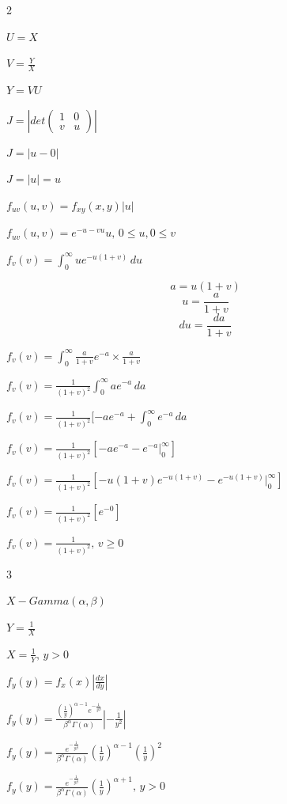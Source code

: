 \documentclass[12 pt]{article}
\begin{document}
    \begin{exercise}{2}
    \hfill

    $U=X$

    $V = \frac{Y}{X}$

    $Y = VU$

    $J = |det \begin{pmatrix}
        1 & 0 \\
        v & u
    \end{pmatrix}|$

    $J = |u - 0|$

    $J = |u| = u$

    \hfill

    $f_{uv}(u,v) = f_{xy}(x,y) |u|$

    $f_{uv}(u,v) = e^{-u-vu} u, \, 0 \leq u, 0 \leq v$

    $f_v(v) = \int_{0}^{\infty} ue^{-u(1+v)} \, du$

    $$a = u(1+v)$$
    $$u = \frac{a}{1+v}$$
    $$du = \frac{da}{1+v}$$

    $f_v(v) = \int_{0}^{\infty} \frac{a}{1+v}e^{-a} \times \frac{a}{1+v}$

    $f_v(v) = \frac{1}{(1+v)^2} \int_{0}^{\infty} a e^{-a} \, da$

    $f_v(v) = \frac{1}{(1+v)^2}[-a e^{-a} + \int_{0}^{\infty} e^{-a} \, da$

    $f_v(v) = \frac{1}{(1+v)^2}[-a e^{-a} - e^{-a} |_{0}^{\infty}]$

    $f_v(v) = \frac{1}{(1+v)^2}[-u(1+v)e^{-u(1+v)} - e^{-u(1+v)} |_{0}^{\infty}]$

    $f_v(v) = \frac{1}{(1+v)^2}[e^{-0}]$

    $f_v(v) = \frac{1}{(1+v)^2}, \, v \geq 0$

    \hfill    
    \end{exercise}



    \begin{exercise}{3}
    \hfill

    $X - Gamma(\alpha, \beta)$

    $Y = \frac{1}{X}$

    $X = \frac{1}{Y}, \, y>0$

    $f_y(y) = f_x(x) |\frac{dx}{dy}|$

    $f_y(y) = \frac{(\frac{1}{y})^{\alpha - 1}e^{-\frac{1}{y \beta}}}{\beta^{\alpha} \Gamma(\alpha)} |-\frac{1}{y^2}|$

    $f_y(y) = \frac{e^{-\frac{1}{y \beta}}}{\beta^{\alpha} \Gamma(\alpha)}(\frac{1}{y})^{\alpha - 1}(\frac{1}{y})^2$

    $f_y(y) = \frac{e^{-\frac{1}{y \beta}}}{\beta^{\alpha} \Gamma(\alpha)}(\frac{1}{y})^{\alpha + 1}, \, y>0$

    \hfill
    \end{exercise}
\end{document}
